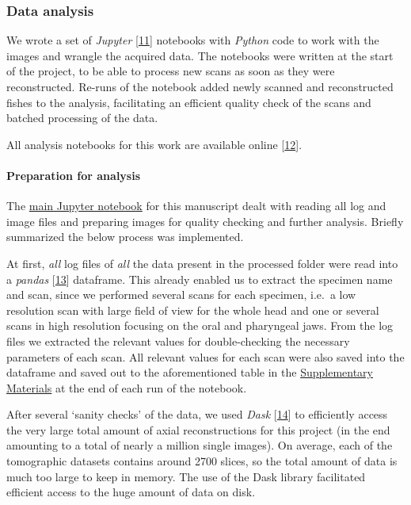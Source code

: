 \hypertarget{data-analysis}{%
\subsubsection{Data analysis}\label{data-analysis}}

We wrote a set of \emph{Jupyter} {[}\protect\hyperlink{ref-pQ6Wbz73}{11}{]} notebooks with \emph{Python} code to work with the images and wrangle the acquired data.
The notebooks were written at the start of the project, to be able to process new scans as soon as they were reconstructed.
Re-runs of the notebook added newly scanned and reconstructed fishes to the analysis, facilitating an efficient quality check of the scans and batched processing of the data.

All analysis notebooks for this work are available online {[}\protect\hyperlink{ref-1HteOscVd}{12}{]}.

\hypertarget{preparation-for-analysis}{%
\paragraph{Preparation for analysis}\label{preparation-for-analysis}}

The \href{https//github.com/habi/EAWAG/blob/master/DisplayFishes.ipynb}{main Jupyter notebook} for this manuscript dealt with reading all log and image files and preparing images for quality checking and further analysis.
Briefly summarized the below process was implemented.

At first, \emph{all} log files of \emph{all} the data present in the processed folder were read into a \emph{pandas} {[}\protect\hyperlink{ref-19qQOHlFN}{13}{]} dataframe.
This already enabled us to extract the specimen name and scan, since we performed several scans for each specimen, i.e.~a low resolution scan with large field of view for the whole head and one or several scans in high resolution focusing on the oral and pharyngeal jaws.
From the log files we extracted the relevant values for double-checking the necessary parameters of each scan.
All relevant values for each scan were also saved into the dataframe and saved out to the aforementioned table in the \protect\hyperlink{supplementary-materials}{Supplementary Materials} at the end of each run of the notebook.

After several `sanity checks' of the data, we used \emph{Dask} {[}\protect\hyperlink{ref-hj1CnyWB}{14}{]} to efficiently access the very large total amount of axial reconstructions for this project (in the end amounting to a total of nearly a million single images).
On average, each of the tomographic datasets contains around 2700 slices, so the total amount of data is much too large to keep in memory.
The use of the Dask library facilitated efficient access to the huge amount of data on disk.

